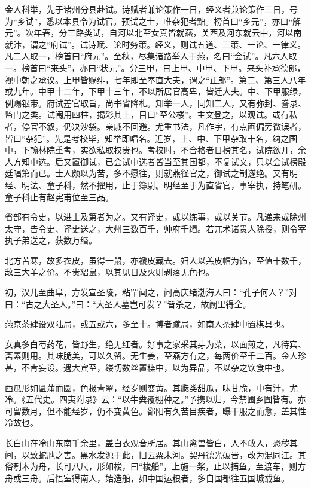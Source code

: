 \documentclass[]{article}
\begin{document}
金人科举，先于诸州分县赴试。诗赋者兼论策作一日，经义者兼论策作三日，号为``乡试''，悉以本县令为试官。预试之士，唯杂犯者黜。榜首曰``乡元''，亦曰``解元''。次年春，分三路类试，自河以北至女真皆就燕，关西及河东就云中，河以南就汴，谓之``府试''。试诗赋、论时务策。经义，则试五道、三策、一论、一律义。凡二人取一，榜首曰``府元''。至秋，尽集诸路举人于燕，名曰``会试''。凡六人取一。榜首曰``来头''，亦曰``状元''。分三甲，曰上甲、中甲、下甲。来头补承德郎，视中朝之承议。上甲皆赐绯，七年即至奉直大夫，谓之``正郎''。第二、第三人八年或九年。中甲十二年，下甲十三年，不以所居官高卑，皆迁大夫。中、下甲服绿，例赐银带。府试差官取旨，尚书省降札。知举一人，同知二人，又有弥封、誊录、监门之类。试闱用四柱，揭彩其上，目曰``至公楼''。主文登之，以观试。或有私者，停官不叙，仍决沙袋。亲戚不回避。尤重书法，凡作字，有点画偏旁微误者，皆曰``杂犯''。先是考校毕，知举即唱名。近岁，上、中、下甲杂取十名，纳之国中，下翰林院重考，实欲私取权贵也。考校时，不合格者日榜其名，试院欲开，余人方知中选。后又置御试，已会试中选者皆当至其国都，不复试文，只以会试榜殿廷唱第而已。士人颇以为苦，多不愿往，则就燕径官之，御试之制遂绝。又有明经、明法、童子科，然不擢用，止于簿尉。明经至于为直省官，事宰执，持笔研。童子科止有赵宪甫位至三品。

省部有令史，以进士及第者为之。又有译史，或以练事，或以关节。凡递来或除州太守，告令史、译史送之，大州三数百千，帅府千缗。若兀术诸贵人除授，则令宰执子弟送之，获数万缗。

北方苦寒，故多衣皮，虽得一鼠，亦褫皮藏去。妇人以羔皮帽为饰，至值十数千，敌三大羊之价。不贵貂鼠，以其见日及火则剥落无色也。

初，汉儿至曲阜，方发宣圣陵，粘罕闻之，问高庆绪渤海人曰：``孔子何人？''对曰：``古之大圣人。''曰：``大圣人墓岂可发？''皆杀之，故阙里得全。

燕京茶肆设双陆局，或五或六，多至十。博者蹴局，如南人茶肆中置棋具也。

女真多白芍药花，皆野生，绝无红者。好事之家采其芽为菜，以面煎之，凡待宾、斋素则用。其味脆美，可以久留。无生姜，至燕方有之，每两价至千二百。金人珍甚，不肯妄设。遇大宾至，缕切数丝置楪中，以为异品，不以杂之饮食中也。

西瓜形如匾蒲而圆，色极青翠，经岁则变黄。其瓞类甜瓜，味甘脆，中有汁，尤冷。《五代史。四夷附录》云：``以牛粪覆棚种之。''予携以归，今禁圃乡囿皆有。亦可留数月，但不能经岁，仍不变黄色。鄱阳有久苦目疾者，曝干服之而愈，盖其性冷故也。

长白山在冷山东南千余里，盖白衣观音所居。其山禽兽皆白，人不敢入，恐秽其间，以致蛇虺之害。黑水发源于此，旧云粟末河。契丹德光破晋，改为混同江。其俗刳木为舟，长可八尺，形如梭，曰``梭船''，上施一桨，止以捕鱼。至渡车，则方舟或三舟。后悟室得南人，始造船，如中国运粮者，多自国都往五国城载鱼。
\end{document}
